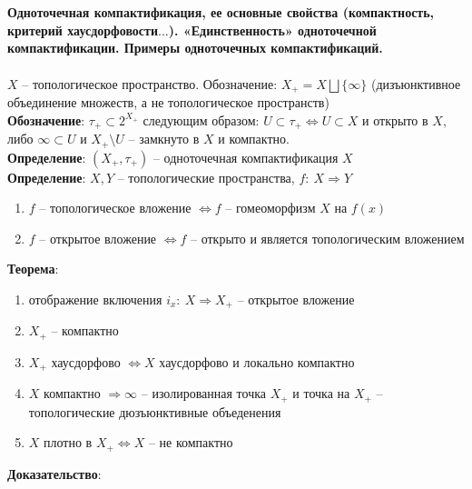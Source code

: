 \section{}
	\textbf{Одноточечная компактификация, ее основные свойства (компактность, критерий хаусдорфовости$\ldots$). «Единственность» одноточечной компактификации. Примеры одноточечных компактификаций.}\\
	\\
	$X$ -- топологическое пространство. Обозначение: $X_{+}=X \bigsqcup \{\infty\}$ (дизъюнктивное объединение множеств, а не топологическое  пространств)\\
	\textbf{Обозначение}: ${\tau}_{+}\subset 2^{X_{+}}$ следующим образом: $U\subset \tau_{+} \Leftrightarrow U\subset X$ и открыто в $X$, либо $\infty\subset U$ и $X_{+}\setminus U$ -- замкнуто в $X$ и компактно.\\
	\textbf{Определение}: $(X_{+}, {\tau}_{+})$ -- одноточечная компактификация $X$\\
	\textbf{Определение}: $X, Y$ -- топологические пространства, $f:\ X\Rightarrow Y$\\
	\begin{enumerate}
		\item 
		$f$ -- топологическое вложение $\Leftrightarrow f$ -- гомеоморфизм $X$ на $f(x)$
		\item 
		$f$ -- открытое вложение $\Leftrightarrow f$ -- открыто и является топологическим вложением
	\end{enumerate}
	\textbf{Теорема}: 
	\begin{enumerate}
		\item 
		отображение включения $i_x:\ X\Rightarrow X_{+}$ -- открытое вложение
		\item 
		$X_{+}$ -- компактно
		\item 
		$X_{+}$ хаусдорфово $\Leftrightarrow X$ хаусдорфово и локально компактно
		\item 
		$X$ компактно $\Rightarrow \infty$ -- изолированная точка $X_{+}$ и точка на $X_{+}$ -- топологические дюзъюнктивные объеденения
		\item 
		$X$ плотно в $X_{+} \Leftrightarrow X$ -- не компактно
	\end{enumerate}
	\textbf{Доказательство}: 
